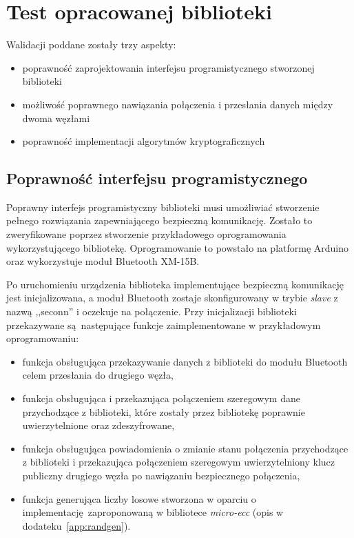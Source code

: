 \chapter{Test opracowanej biblioteki}
\label{cha:walidacja}

Walidacji poddane zostały trzy aspekty:

\begin{itemize}
\item poprawność zaprojektowania interfejsu programistycznego stworzonej biblioteki
\item możliwość poprawnego nawiązania połączenia i przesłania danych między dwoma węzłami
\item poprawność implementacji algorytmów kryptograficznych
\end{itemize}

\section{Poprawność interfejsu programistycznego}

Poprawny interfejs programistyczny biblioteki musi umożliwiać stworzenie pełnego rozwiązania zapewniającego bezpieczną komunikację. Zostało to zweryfikowane poprzez stworzenie przykładowego oprogramowania wykorzystującego bibliotekę. Oprogramowanie to powstało na platformę Arduino oraz wykorzystuje moduł Bluetooth XM-15B.

Po uruchomieniu urządzenia biblioteka implementujące bezpieczną komunikację jest inicjalizowana, a moduł Bluetooth zostaje skonfigurowany w trybie \emph{slave} z nazwą ,,seconn'' i oczekuje na połączenie. Przy inicjalizacji biblioteki przekazywane są następujące funkcje zaimplementowane w przykładowym oprogramowaniu:

\begin{itemize}
    \item funkcja obsługująca przekazywanie danych z biblioteki do modułu Bluetooth celem przesłania do drugiego węzła,
    \item funkcja obsługująca i przekazująca połączeniem szeregowym dane przychodzące z biblioteki, które zostały przez bibliotekę poprawnie uwierzytelnione oraz zdeszyfrowane,
    \item funkcja obsługująca powiadomienia o zmianie stanu połączenia przychodzące z biblioteki i przekazująca połączeniem szeregowym uwierzytelniony klucz publiczny drugiego węzła po nawiązaniu bezpiecznego połączenia,
    \item funkcja generująca liczby losowe stworzona w oparciu o implementację zaproponowaną w bibliotece {\itshape micro-ecc} (opis w dodateku~\ref{app:randgen}).
\end{itemize}

